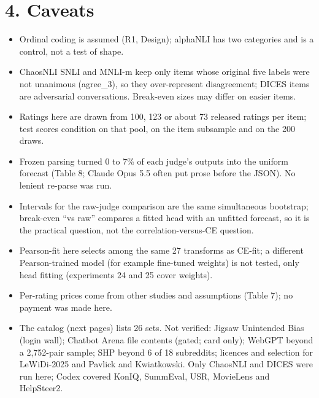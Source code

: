\documentclass[10pt]{article}
\begin{document}
\section*{4. Caveats}
\begin{itemize}\setlength\itemsep{1pt}
\item Ordinal coding is assumed (R1, Design); alphaNLI has two categories and is a control, not a test of shape.
\item ChaosNLI SNLI and MNLI-m keep only items whose original five labels were not unanimous (agree\_3), so they over-represent disagreement; DICES items are adversarial conversations. Break-even sizes may differ on easier items.
\item Ratings here are drawn from 100, 123 or about 73 released ratings per item; test scores condition on that pool, on the item subsample and on the 200 draws.
\item Frozen parsing turned 0 to 7\% of each judge's outputs into the uniform forecast (Table 8; Claude Opus 5.5 often put prose before the JSON). No lenient re-parse was run.
\item Intervals for the raw-judge comparison are the same simultaneous bootstrap; break-even ``vs raw'' compares a fitted head with an unfitted forecast, so it is the practical question, not the correlation-versus-CE question.
\item Pearson-fit here selects among the same 27 transforms as CE-fit; a different Pearson-trained model (for example fine-tuned weights) is not tested, only head fitting (experiments 24 and 25 cover weights).
\item Per-rating prices come from other studies and assumptions (Table 7); no payment was made here.
\item The catalog (next pages) lists 26 sets. Not verified: Jigsaw Unintended Bias (login wall); Chatbot Arena file contents (gated; card only); WebGPT beyond a 2,752-pair sample; SHP beyond 6 of 18 subreddits; licences and selection for LeWiDi-2025 and Pavlick and Kwiatkowski. Only ChaosNLI and DICES were run here; Codex covered KonIQ, SummEval, USR, MovieLens and HelpSteer2.
\end{itemize}

\clearpage{}\pdfpagewidth=11in\pdfpageheight=8.5in
\end{document}
